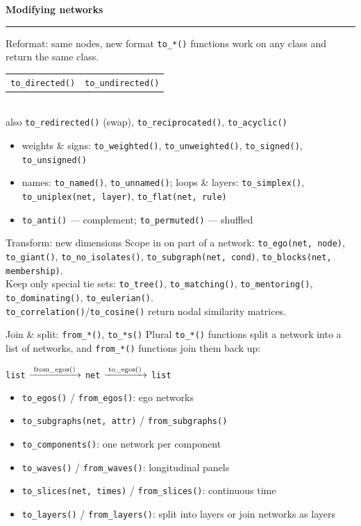 \documentclass[9pt]{extarticle}
\let\code\verb
\newcommand{\pipe}[1]{\;\textcolor{mngoldd}{$\xrightarrow{\;\text{\scriptsize #1}\;}$}\;}
\newcommand{\colhead}[2]{%
  {\color{mnink}\bfseries\large #1\; #2}\\[-4pt]
  {\color{mngold}\rule{\linewidth}{1.2pt}}\vspace{1pt}}
\newcommand{\glyph}[1]{\begin{tikzpicture}[baseline=-2pt, scale=0.34]#1\end{tikzpicture}}
\newcommand{\gdirected}{\glyph{
  \node[gnode] (a) at (-0.45,0) {};\node[gnode] (b) at (0.45,0) {};
  \path[gdir] (a) to[bend left=25] (b);\path[gdir] (b) to[bend left=25] (a);}}
\newcommand{\gundirected}{\glyph{
  \node[gnode] (a) at (-0.45,0) {};\node[gnode] (b) at (0.45,0) {};
  \path[gtie] (a)--(b);}}
\begin{document}
\begin{minipage}[t]{0.323\textwidth}
\colhead{\faMagic}{Modifying networks}

\begin{mnbox}{Reformat: same nodes, new format}
\code|to_*()| functions work on any class and return the same class.\\[2pt]
\begin{tabular}{@{}l@{\;\;}l@{}}
\gdirected\;\code|to_directed()| & \gundirected\;\code|to_undirected()|\\
\end{tabular}\\[1pt]
also \code|to_redirected()| (swap), \code|to_reciprocated()|, \code|to_acyclic()|
\begin{itemize}
\item weights \& signs: \code|to_weighted()|, \code|to_unweighted()|,
\code|to_signed()|, \code|to_unsigned()|
\item names: \code|to_named()|, \code|to_unnamed()|;
loops \& layers: \code|to_simplex()|, \code|to_uniplex(net, layer)|,
\code|to_flat(net, rule)|
\item \code|to_anti()| — complement; \code|to_permuted()| — shuffled
\end{itemize}
\end{mnbox}

\begin{mnbox}{Transform: new dimensions}
Scope in on part of a network: \code|to_ego(net, node)|, \code|to_giant()|,
\code|to_no_isolates()|, \code|to_subgraph(net, cond)|, \code|to_blocks(net, membership)|.\\[2pt]
Keep only special tie sets: \code|to_tree()|, \code|to_matching()|, \code|to_mentoring()|,
\code|to_dominating()|, \code|to_eulerian()|.\\[2pt]
\code|to_correlation()|/\code|to_cosine()| return nodal similarity matrices.
\end{mnbox}

\begin{mnbox}{Join \& split: \texttt{from\_*()}, \texttt{to\_*s()}}
Plural \code|to_*()| functions split a network into a list of networks, and \code|from_*()|
functions join them back up:
\begin{center}
\code|list| \pipe{from\_egos()} \code|net| \pipe{to\_egos()} \code|list|
\end{center}
\begin{itemize}
\item \code|to_egos()| / \code|from_egos()|: ego networks
\item \code|to_subgraphs(net, attr)| / \code|from_subgraphs()|
\item \code|to_components()|: one network per component
\item \code|to_waves()| / \code|from_waves()|: longitudinal panels
\item \code|to_slices(net, times)| / \code|from_slices()|: continuous time
\item \code|to_layers()| / \code|from_layers()|: split into layers or
join networks as layers
\end{itemize}
\end{mnbox}


\end{minipage}
\end{document}
